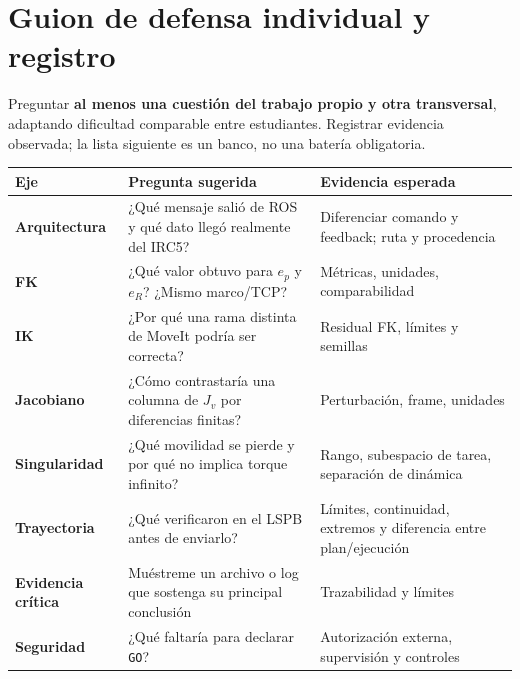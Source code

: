 \documentclass[10pt, a4paper]{article}
\begin{document}
\newpage
\section{Guion de defensa individual y registro}

Preguntar \textbf{al menos una cuestión del trabajo propio y otra transversal}, adaptando dificultad comparable entre estudiantes. Registrar evidencia observada; la lista siguiente es un banco, no una batería obligatoria.

\begingroup
\scriptsize
\setlength{\tabcolsep}{3.5pt}
\renewcommand{\arraystretch}{1.35}
\noindent\begin{tabularx}{\textwidth}{|l|>{\hsize=1.10\hsize\raggedright\arraybackslash}X|>{\hsize=0.90\hsize\raggedright\arraybackslash}X|}
\hline
\rowcolor{ucbblue!15}
\textbf{Eje} & \textbf{Pregunta sugerida} & \textbf{Evidencia esperada} \\ \hline
\textbf{Arquitectura} & ¿Qué mensaje salió de ROS y qué dato llegó realmente del IRC5? & Diferenciar comando y feedback; ruta y procedencia \\ \hline
\textbf{FK} & ¿Qué valor obtuvo para $e_p$ y $e_R$? ¿Mismo marco/TCP? & Métricas, unidades, comparabilidad \\ \hline
\textbf{IK} & ¿Por qué una rama distinta de MoveIt podría ser correcta? & Residual FK, límites y semillas \\ \hline
\textbf{Jacobiano} & ¿Cómo contrastaría una columna de $J_v$ por diferencias finitas? & Perturbación, frame, unidades \\ \hline
\textbf{Singularidad} & ¿Qué movilidad se pierde y por qué no implica torque infinito? & Rango, subespacio de tarea, separación de dinámica \\ \hline
\textbf{Trayectoria} & ¿Qué verificaron en el LSPB antes de enviarlo? & Límites, continuidad, extremos y diferencia entre plan/ejecución \\ \hline
\textbf{Evidencia crítica} & Muéstreme un archivo o log que sostenga su principal conclusión & Trazabilidad y límites \\ \hline
\textbf{Seguridad} & ¿Qué faltaría para declarar \texttt{GO}? & Autorización externa, supervisión y controles \\ \hline
\end{tabularx}
\endgroup
\end{document}
